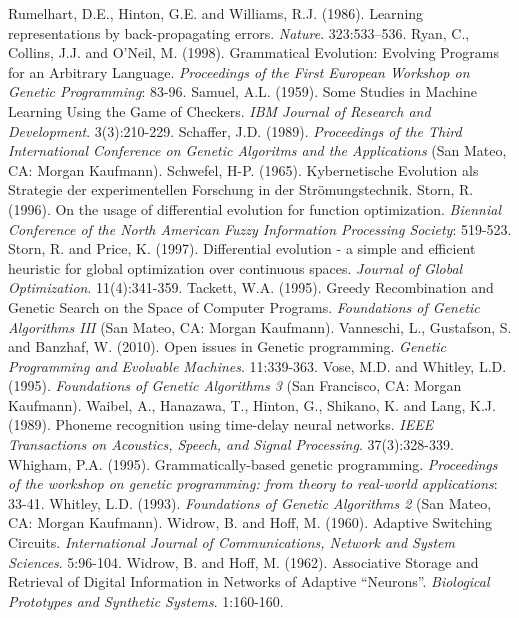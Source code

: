 \documentclass[spanish,a4paper,12pt,twoside]{report}
\begin{document}
\begin{thebibliography}{00}
   Rumelhart, D.E., Hinton, G.E. and Williams, R.J. (1986). Learning representations by back-propagating errors. \emph{Nature}. 323:533–536.
   Ryan, C., Collins, J.J. and O'Neil, M. (1998). Grammatical Evolution: Evolving Programs for an Arbitrary Language. \emph{Proceedings of the First European Workshop on Genetic Programming}: 83-96.
   Samuel, A.L. (1959). Some Studies in Machine Learning Using the Game of Checkers. \emph{IBM Journal of Research and Development}. 3(3):210-229.
   Schaffer, J.D. (1989). \emph{Proceedings of the Third International Conference on Genetic Algoritms and the Applications} (San Mateo, CA: Morgan Kaufmann).
   Schwefel, H-P. (1965). Kybernetische Evolution als Strategie der experimentellen Forschung in der Strömungstechnik.
   Storn, R. (1996). On the usage of differential evolution for function optimization. \emph{Biennial Conference of the North American Fuzzy Information Processing Society}: 519-523.
   Storn, R. and Price, K. (1997). Differential evolution - a simple and efficient heuristic for global optimization over continuous spaces. \emph{Journal of Global Optimization}. 11(4):341-359.
   Tackett, W.A. (1995). Greedy Recombination and Genetic Search on the Space of Computer Programs. \emph{Foundations of Genetic Algorithms III} (San Mateo, CA: Morgan Kaufmann).
   Vanneschi, L., Gustafson, S. and Banzhaf, W. (2010). Open issues in Genetic programming. \emph{Genetic Programming and Evolvable Machines}. 11:339-363.
   Vose, M.D. and Whitley, L.D. (1995). \emph{Foundations of Genetic Algorithms 3} (San Francisco, CA: Morgan Kaufmann).
   Waibel, A., Hanazawa, T., Hinton, G., Shikano, K. and Lang, K.J. (1989). Phoneme recognition using time-delay neural networks. \emph{IEEE Transactions on Acoustics, Speech, and Signal Processing}. 37(3):328-339.
   Whigham, P.A. (1995). Grammatically-based genetic programming. \emph{Proceedings of the workshop on genetic programming: from theory to real-world applications}: 33-41.
   Whitley, L.D. (1993). \emph{Foundations of Genetic Algorithms 2} (San Mateo, CA: Morgan Kaufmann).
   Widrow, B. and Hoff, M. (1960). Adaptive Switching Circuits. \emph{International Journal of Communications, Network and System Sciences}. 5:96-104.
   Widrow, B. and Hoff, M. (1962). Associative Storage and Retrieval of Digital Information in Networks of Adaptive “Neurons”. \emph{Biological Prototypes and Synthetic Systems}. 1:160-160.
  \end{thebibliography}
  
\end{document}
